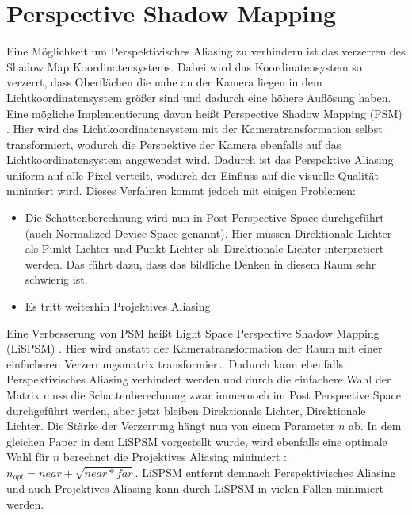\section{Perspective Shadow Mapping}
\label{section:psm}
Eine Möglichkeit um Perspektivisches Aliasing zu verhindern ist das verzerren 
des Shadow Map Koordinatensystems. 
Dabei wird das Koordinatensystem so verzerrt, dass Oberflächen die nahe an der Kamera liegen in dem
Lichtkoordinatensystem größer sind und dadurch eine höhere Auflösung haben.
Eine mögliche Implementierung davon heißt Perspective Shadow Mapping (PSM) \cite{PSM2002}.
Hier wird das Lichtkoordinatensystem mit der Kameratransformation selbst transformiert, wodurch
die Perspektive der Kamera ebenfalls auf das Lichtkoordinatensystem angewendet wird.
Dadurch ist das Perspektive Aliasing uniform auf alle Pixel verteilt,
wodurch der Einfluss auf die visuelle Qualität minimiert wird.
Dieses Verfahren kommt jedoch mit einigen Problemen:
\begin{itemize}
  \item Die Schattenberechnung wird nun in Post Perspective Space durchgeführt (auch Normalized Device Space genannt).
    Hier müssen Direktionale Lichter als Punkt Lichter und Punkt Lichter als Direktionale Lichter interpretiert werden.
    Das führt dazu, dass das bildliche Denken in diesem Raum sehr schwierig ist.
  \item Es tritt weiterhin Projektives Aliasing.
\end{itemize}
Eine Verbesserung von PSM heißt Light Space Perspective Shadow Mapping (LiSPSM) \cite{LiPSM2004}.
Hier wird anstatt der Kameratransformation der Raum mit einer einfacheren Verzerrungsmatrix transformiert.
Dadurch kann ebenfalls Perspektivisches Aliasing verhindert werden und
durch die einfachere Wahl der Matrix muss die Schattenberechnung zwar immernoch im Post Perspective Space durchgeführt werden,
aber jetzt bleiben Direktionale Lichter, Direktionale Lichter.
Die Stärke der Verzerrung hängt nun von einem Parameter $n$ ab. 
In dem gleichen Paper in dem LiSPSM vorgestellt wurde, wird ebenfalls eine optimale Wahl für $n$ berechnet
die Projektives Aliasing minimiert : $n_{opt} = near + \sqrt{near * far}$.
LiSPSM entfernt demnach Perspektivisches Aliasing und auch Projektives Aliasing kann durch LiSPSM in vielen Fällen
minimiert werden.
